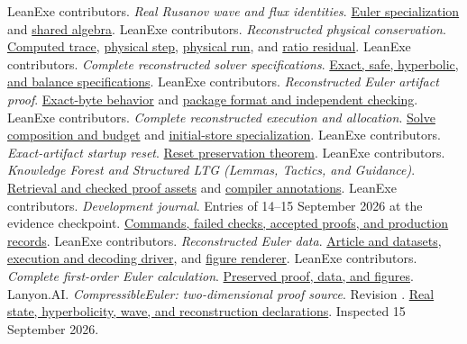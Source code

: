 \documentclass[11pt]{article}
\newcommand{\longcode}[1]{\texttt{\seqsplit{#1}}}
\newcommand{\repo}[2]{\href{https://github.com/jsmorph/leanexe/blob/73e5b54ee6ba398cdd4d42feadc42e2c6ec5a33a/#1}{#2}}
\newcommand{\proofref}[2]{\repo{proofs/talos/lean/Project/#1}{#2}}
\begin{document}
\begin{thebibliography}{99}
 LeanExe contributors.  \emph{Real Rusanov wave and flux identities}.  \proofref{EulerRiemann/RealWaves.lean}{Euler specialization} and \proofref{ProofKit/RealLaxFriedrichs.lean}{shared algebra}.
 LeanExe contributors.  \emph{Reconstructed physical conservation}.  \proofref{EulerReconstructed/TraceBalance.lean}{Computed trace}, \proofref{EulerReconstructed/PhysicalStep.lean}{physical step}, \proofref{EulerReconstructed/PhysicalTrace.lean}{physical run}, and \proofref{EulerReconstructed/RatioResidual.lean}{ratio residual}.
 LeanExe contributors.  \emph{Complete reconstructed solver specifications}.  \proofref{EulerReconstructed/Spec.lean}{Exact, safe, hyperbolic, and balance specifications}.
 LeanExe contributors.  \emph{Reconstructed Euler artifact proof}.  \proofref{EulerReconstructed/ArtifactTranslation.lean}{Exact-byte behavior} and \repo{docs/artifact-format.md}{package format and independent checking}.
 LeanExe contributors.  \emph{Complete reconstructed execution and allocation}.  \proofref{EulerReconstructed/ExecutionSolve.lean}{Solve composition and budget} and \proofref{EulerReconstructed/SolveInitial.lean}{initial-store specialization}.
 LeanExe contributors.  \emph{Exact-artifact startup reset}.  \proofref{EulerReconstructed/HostInitial.lean}{Reset preservation theorem}.
 LeanExe contributors.  \emph{Knowledge Forest and Structured LTG (Lemmas, Tactics, and Guidance)}.  \repo{docs/ltg.md}{Retrieval and checked proof assets} and \repo{docs/annotations.md}{compiler annotations}.
 LeanExe contributors.  \emph{Development journal}.  Entries of 14--15 September 2026 at the evidence checkpoint.  \repo{journal.md}{Commands, failed checks, accepted proofs, and production records}.
 LeanExe contributors.  \emph{Reconstructed Euler data}.  \repo{data/euler-reconstructed-v1/README.md}{Article and datasets}, \repo{tools/euler-riemann-complete.js}{execution and decoding driver}, and \repo{tools/euler-riemann-plot.py}{figure renderer}.
 LeanExe contributors.  \emph{Complete first-order Euler calculation}.  \repo{data/euler-riemann-complete-v1/README.md}{Preserved proof, data, and figures}.
 Lanyon.AI.  \emph{CompressibleEuler: two-dimensional proof source}.  Revision \longcode{a736aa5f8b17efd225c4692404e2442361d06729}.  \href{https://github.com/lanyonai/CompressibleEuler/blob/a736aa5f8b17efd225c4692404e2442361d06729/proofs/compressible_euler_2d.lean}{Real state, hyperbolicity, wave, and reconstruction declarations}.  Inspected 15 September 2026.

\end{thebibliography}
\end{document}
